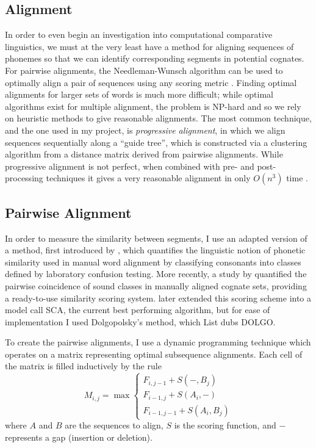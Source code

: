 \documentclass[doc,natbib,12pt]{apa6}
\begin{document}
\subsection{Alignment}

In order to even begin an investigation into computational comparative linguistics, we must at the very least have a method for aligning sequences of phonemes so that we can identify corresponding segments in potential cognates. For pairwise alignments, the Needleman-Wunsch algorithm can be used to optimally align a pair of sequences using any scoring metric \citep{Needleman1970}. Finding optimal alignments for larger sets of words is much more difficult; while optimal algorithms exist for multiple alignment, the problem is NP-hard and so we rely on heuristic methods to give reasonable alignments. The most common technique, and the one used in my project, is \emph{progressive alignment}, in which we align sequences sequentially along a ``guide tree'', which is constructed via a clustering algorithm from a distance matrix derived from pairwise alignments. While progressive alignment is not perfect, when combined with pre- and post-processing techniques it gives a very reasonable alignment in only $O(n^3)$ time \citep{Feng1987}. 

\subsection{Pairwise Alignment}

In order to measure the similarity between segments, I use an adapted version of a method, first introduced by \citet{Dolgopolsky1986}, which quantifies the linguistic notion of phonetic similarity used in manual word alignment by classifying consonants into classes defined by laboratory confusion testing. More recently, a study by \citet{Turchin2010} quantified the pairwise coincidence of sound classes in manually aligned cognate sets, providing a ready-to-use similarity scoring system. \citet{List2012a} later extended this scoring scheme into a model call SCA, the current best performing algorithm, but for ease of implementation I used Dolgopolsky's method, which List dubs DOLGO.

To create the pairwise alignments, I use a dynamic programming technique which operates on a matrix representing optimal subsequence alignments. Each cell of the matrix is filled inductively by the rule 
\begin{equation}
M_{i,j} = \max\begin{cases}
F_{i,j-1} + S(-, B_j)\\
F_{i-1,j} + S(A_i, -)\\
F_{i-1, j-1} + S(A_i, B_j)
\end{cases}
\end{equation}
where $A$ and $B$ are the sequences to align, $S$ is the scoring function, and $-$ represents a gap (insertion or deletion).
\end{document}
